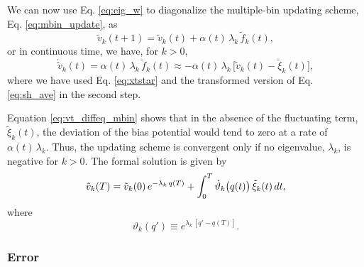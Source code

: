 \documentclass[reprint, superscriptaddress, floatfix]{revtex4-1}
\begin{document}
We can now use Eq. \eqref{eq:eig_w} to diagonalize
the multiple-bin updating scheme, Eq. \eqref{eq:mbin_update},
as
%
\begin{equation}
  {\tilde v}_k(t + 1) =
  {\tilde v}_k(t) + \alpha(t) \, \lambda_k \,
  {\tilde f}_k(t)
  ,
  \label{eq:vkupdate}
\end{equation}
%
or in continuous time, we have, for $k > 0$,
%
\begin{equation}
  \dot{\tilde v}_k(t)
  =
  \alpha(t) \, \lambda_k \, {\tilde f}_k(t)
  \approx
  -\alpha(t) \, \lambda_k \,
  \bigl[ {\tilde v}_k(t) - {\tilde \xi}_k(t) \bigr]
  ,
  \label{eq:vt_diffeq_mbin}
\end{equation}
%
where
we have used Eq. \eqref{eq:xtstar} and
the transformed version of Eq. \eqref{eq:sh_ave}
in the second step.

Equation \eqref{eq:vt_diffeq_mbin} shows that
in the absence of the fluctuating term, $\tilde \xi_k(t)$,
the deviation of the bias potential would tend to zero
at a rate of $\alpha(t) \, \lambda_k$.
%
Thus, the updating scheme is convergent
only if no eigenvalue, $\lambda_k$, is negative
for $k > 0$.
%
%
The formal solution is given by
\begin{equation}
  \tilde v_k(T)
  =
  \tilde v_k(0) \, e^{-\lambda_k \, q(T)}
  +
  \int_0^T
    \dot{\vartheta}_k\bigl( q(t) \bigr) \, \tilde\xi_k(t) \, dt
  ,
  \notag
\end{equation}
where
\begin{equation}
  \vartheta_k(q') \equiv e^{\lambda_k \, [q' - q(T)]}
  .
  \label{eq:uk_def}
\end{equation}





\subsubsection{Error}
\end{document}
